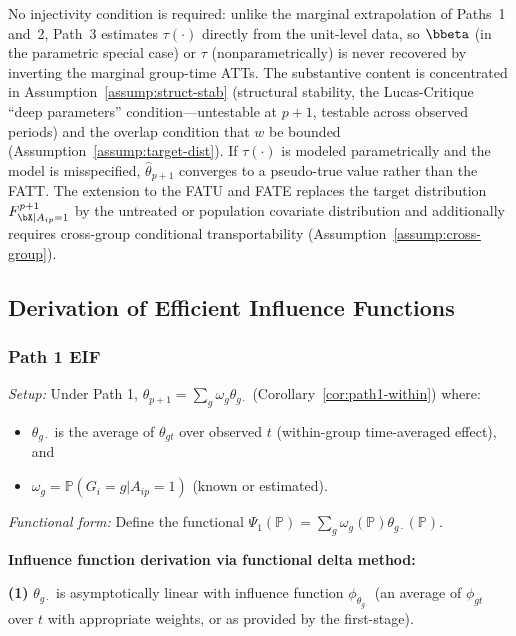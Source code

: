 \documentclass{article}
\renewcommand{\P}{\mathbb{P}}
\begin{document}
\begin{remark}
No injectivity condition is required: unlike the marginal extrapolation of Paths~1 and~2, Path~3 estimates $\tau(\cdot)$ directly from the unit-level data, so $\bbeta$ (in the parametric special case) or $\tau$ (nonparametrically) is never recovered by inverting the marginal group-time ATTs. The substantive content is concentrated in Assumption~\ref{assump:struct-stab} (structural stability, the Lucas-Critique ``deep parameters'' condition---untestable at $p+1$, testable across observed periods) and the overlap condition that $w$ be bounded (Assumption~\ref{assump:target-dist}). If $\tau(\cdot)$ is modeled parametrically and the model is misspecified, $\widehat\theta_{p+1}$ converges to a pseudo-true value rather than the FATT. The extension to the FATU and FATE replaces the target distribution $F_{\bX | A_{ip}=1}^{p+1}$ by the untreated or population covariate distribution and additionally requires cross-group conditional transportability (Assumption~\ref{assump:cross-group}).
\end{remark}

\subsection{Derivation of Efficient Influence Functions}\label{app:eif}

\subsubsection{Path 1 EIF}\label{app:eif1}

\textit{Setup:} Under Path 1, $\theta_{p+1} = \sum_g \omega_g \theta_{g\cdot}$ (Corollary~\ref{cor:path1-within}) where:
\begin{itemize}
\item $\theta_{g\cdot}$ is the average of $\theta_{gt}$ over observed $t$ (within-group time-averaged effect), and
\item $\omega_g = \P(G_i = g | A_{ip} = 1)$ (known or estimated).
\end{itemize}

\textit{Functional form:} Define the functional $\Psi_1(\P) = \sum_g \omega_g(\P) \theta_{g\cdot}(\P)$.

\textbf{Influence function derivation via functional delta method:}

\textbf{(1)} $\theta_{g\cdot}$ is asymptotically linear with influence function $\phi_{\theta_{g\cdot}}$ (an average of $\phi_{gt}$ over $t$ with appropriate weights, or as provided by the first-stage).
\end{document}
